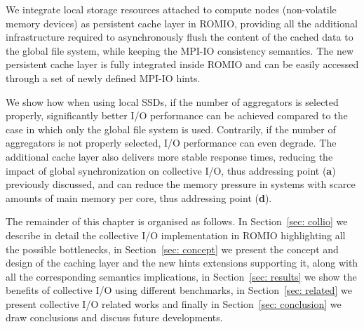 We integrate local storage resources attached to compute nodes (non-volatile memory devices) as persistent cache layer in ROMIO, providing all the additional infrastructure required to asynchronously flush the content of the cached data to the global file system, while keeping the MPI-IO consistency semantics. The new persistent cache layer is fully integrated inside ROMIO and can be easily accessed through a set of newly defined MPI-IO hints.

We show how when using local SSDs, if the number of aggregators is selected properly, significantly better I/O performance can be achieved compared to the case in which only the global file system is used. Contrarily, if the number of aggregators is not properly selected, I/O performance can even degrade. The additional cache layer also delivers more stable response times, reducing the impact of global synchronization on collective I/O, thus addressing point (\textbf{a}) previously discussed, and can reduce the memory pressure in systems with scarce amounts of main memory per core, thus addressing point (\textbf{d}).

The remainder of this chapter is organised as follows. In Section~\ref{sec: collio} we describe in detail the collective I/O implementation in ROMIO highlighting all the possible bottlenecks, in Section~\ref{sec: concept} we present the concept and design of the caching layer and the new hints extensions supporting it, along with all the corresponding semantics implications, in Section~\ref{sec: results} we show the benefits of collective I/O using different benchmarks, in Section~\ref{sec: related} we present collective I/O related works and finally in Section~\ref{sec: conclusion} we draw conclusions and discuss future developments.
